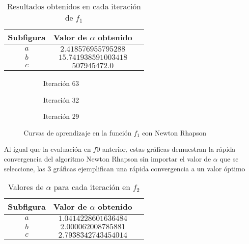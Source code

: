 \begin{table}[H]
    \centering
    \caption{Resultados obtenidos en cada iteración de $f_1$}
    \begin{tabular}{|c|c|c|}
    \hline
    \textbf{Subfigura} & \textbf{Valor de $\alpha$ obtenido} \\
    \hline
    $a$ & $ 2.418576955795288$ \\
    \hline
    $b$ & $ 15.741938591003418$ \\
    \hline
    $c$ & $507945472.0$ \\
    \hline
    \end{tabular}
    \label{tab:values_f0_newton}
\end{table}

\begin{figure}[H]
     \centering
     \begin{subfigure}[b]{0.45\textwidth}
         \centering
         
         \caption{Iteración 63}
         \label{fig:Newton-Rhapson-f0-63}
     \end{subfigure}
     \hfill
     \begin{subfigure}[b]{0.45\textwidth}
         \centering
         
         \caption{Iteración 32}
         \label{fig:Newton-Rhapson-f0-32}
     \end{subfigure}
     \hfill
     \begin{subfigure}[b]{0.45\textwidth}
         \centering
         
         \caption{Iteración 29}
         \label{fig:Newton-Rhapson-f1-29}
     \end{subfigure}
        \caption{Curvas de aprendizaje en la función $f_1$ con Newton Rhapson}
        \label{fig:learning-curves-f1-newton}
\end{figure}


Al igual que la evaluación en $f0$ anterior, estas gráficas demuestran la rápida convergencia del algoritmo Newton Rhapson sin importar el valor de $\alpha$ que se seleccione, las 3 gráficas ejemplifican una rápida convergencia a un valor óptimo

\begin{table}[H]
    \centering
    \caption{Valores de $\alpha$ para cada iteración en $f_2$}
    \begin{tabular}{|c|c|c|}
    \hline
    \textbf{Subfigura} & \textbf{Valor de $\alpha$ obtenido} \\
    \hline
    $a$ & $1.0414228601636484$ \\
    \hline
    $b$ & $2.000062008785881$ \\
    \hline
    $c$ & $2.7938342743454014$ \\
    \hline
    \end{tabular}
    \label{tab:values_f2_newton}
\end{table}

